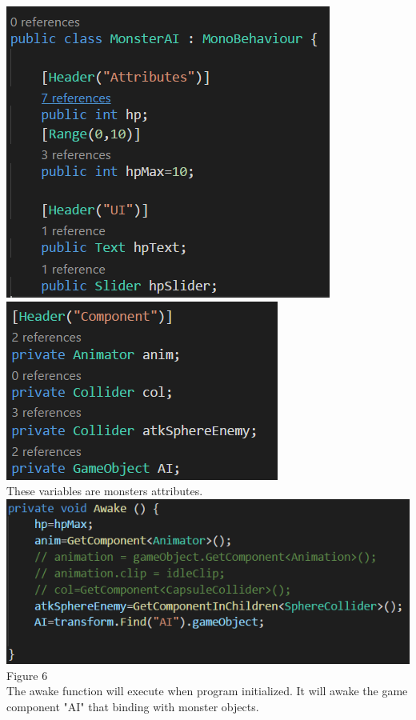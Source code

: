 \begin{itemize}
\includegraphics[scale=0.5]{img/MonsterAttributes1.png}
\includegraphics[scale=0.5]{img/MonsterAttributes2.png}\\
These variables are monsters attributes.\\

\includegraphics[scale=0.5]{img/AI.png}\\{Figure 6}\\
The awake function will execute when program initialized. It will awake the game component "AI" that binding with monster objects.\\


\end{itemize}
